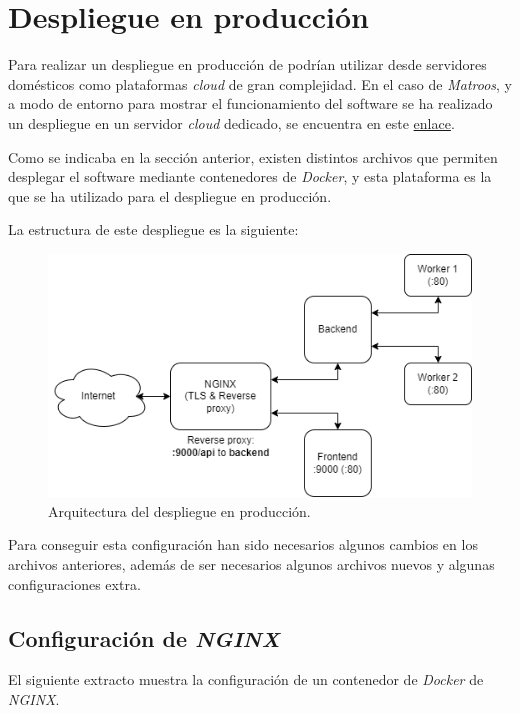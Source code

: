 \section{Despliegue en producción}

Para realizar un despliegue en producción de podrían utilizar desde servidores domésticos como plataformas \textit{cloud} de gran complejidad. En el caso de \textit{Matroos}, y a modo de entorno para mostrar el funcionamiento del software se ha realizado un despliegue en un servidor \textit{cloud} dedicado, se encuentra en este \href{https://0xhc.com:9000/}{enlace}.

Como se indicaba en la sección anterior, existen distintos archivos que permiten desplegar el software mediante contenedores de \textit{Docker}, y esta plataforma es la que se ha utilizado para el despliegue en producción.

La estructura de este despliegue es la siguiente:

\begin{figure}[H]
	\centering
	\includegraphics[width=1\textwidth]{img/production.png}
	\caption{Arquitectura del despliegue en producción.}
\end{figure}

Para conseguir esta configuración han sido necesarios algunos cambios en los archivos anteriores, además de ser necesarios algunos archivos nuevos y algunas configuraciones extra.

\subsection{Configuración de \textit{NGINX}}

El siguiente extracto muestra la configuración de un contenedor de \textit{Docker} de \textit{NGINX}.

